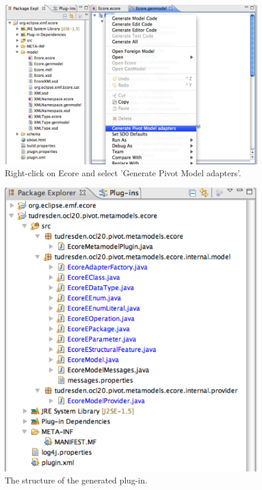 \begin{figure}[!htbp]
	\centering
	\includegraphics[width=1.0\linewidth]{figures/pivotModelAdaption/GeneratePivotModelAdapters}
	\caption{Right-click on Ecore and select 'Generate Pivot Model adapters'.}
	\label{pic:pivotModelAdaption:GeneratePivotModelAdapters}
\end{figure}

\begin{figure}[!htbp]
	\centering
	\includegraphics[width=1.0\linewidth]{figures/pivotModelAdaption/GeneratedPlugin}
	\caption{The structure of the generated plug-in.}
	\label{pic:pivotModelAdaption:GeneratedPlugin}
\end{figure}